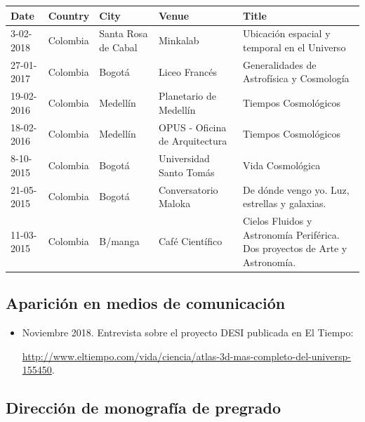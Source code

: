 \documentclass{article}
\begin{document}
\begin{tabular}{p{1.7cm} p{1.2cm} p{2.0cm} p{5.0cm} p{4.5cm}}\hline
Date & Country & City& Venue& Title\\\hline

3-02-2018 & Colombia & Santa Rosa de Cabal & Minkalab & Ubicaci\'on
espacial y temporal en el Universo\\
27-01-2017 & Colombia & Bogot\'a & Liceo Franc\'es & Generalidades de Astrof\'isica y Cosmolog\'ia\\
19-02-2016 & Colombia & Medell\'in & Planetario de Medell\'in & Tiempos Cosmol\'ogicos\\
18-02-2016 & Colombia & Medell\'in & OPUS - Oficina de Arquitectura & Tiempos Cosmol\'ogicos\\
8-10-2015  & Colombia & Bogot\'a & Universidad Santo Tom\'as & Vida Cosmol\'ogica \\
21-05-2015 & Colombia & Bogot\'a & Conversatorio Maloka & De d\'onde vengo yo. Luz, estrellas y galaxias.\\
11-03-2015 & Colombia & B/manga & Caf\'e Cient\'ifico & Cielos Fluidos y Astronom\'ia Perif\'erica. Dos proyectos de Arte y Astronom\'ia.\\\hline
\end{tabular}

\subsection{Aparici\'on en medios de comunicaci\'on}

\begin{itemize}
\item Noviembre 2018. Entrevista sobre el proyecto DESI publicada en El Tiempo:

 \url{http://www.eltiempo.com/vida/ciencia/atlas-3d-mas-completo-del-universp-155450}.
\end{itemize}

\subsection{Direcci\'on de monograf\'ia de pregrado}
\end{document}
